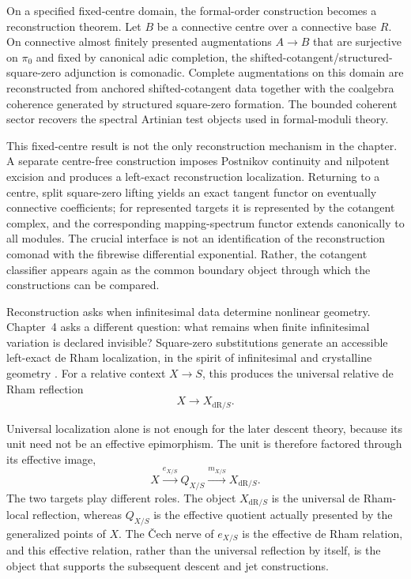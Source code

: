 On a specified fixed-centre domain, the formal-order construction becomes a
reconstruction theorem.  Let \(B\) be a connective centre over a connective
base \(R\).  On connective almost finitely presented augmentations
\(A\to B\) that are surjective on \(\pi_0\) and fixed by canonical adic
completion, the shifted-cotangent/structured-square-zero adjunction is
comonadic.  Complete augmentations on this domain are reconstructed from
anchored shifted-cotangent data together with the coalgebra coherence generated
by
structured square-zero formation.  The bounded coherent sector
recovers the spectral Artinian test objects used in formal-moduli theory.

This fixed-centre result is not the only reconstruction mechanism in the
chapter.  A separate centre-free construction imposes Postnikov continuity
and nilpotent excision and produces a left-exact reconstruction localization.
Returning to a centre, split square-zero lifting yields an exact tangent
functor on eventually connective coefficients; for represented targets it is
represented by the cotangent complex, and the corresponding mapping-spectrum
functor extends canonically to all modules.  The crucial interface is not an
identification of the reconstruction comonad with the fibrewise differential
exponential.  Rather, the cotangent
classifier appears again as the common boundary object through which the
constructions can be compared.

Reconstruction asks when infinitesimal data determine nonlinear geometry.
Chapter~4 asks a different question: what remains when finite infinitesimal
variation is declared invisible?  Square-zero substitutions generate an
accessible left-exact de Rham localization, in the spirit of infinitesimal
and crystalline geometry
\cite{Ogus1975InfinitesimalSite,GaitsgoryRozenblyum2014Crystals,BeilinsonDrinfeld2004}.
For a relative context \(X\to S\), this produces the universal relative
de Rham reflection
\[
    X\longrightarrow X_{\mathrm{dR}/S}.
\]

Universal localization alone is not enough for the later descent theory,
because its unit need not be an effective epimorphism.  The unit is therefore
factored through its effective image,
\[
    X
    \xrightarrow{e_{X/S}}
    Q_{X/S}
    \xrightarrow{m_{X/S}}
    X_{\mathrm{dR}/S}.
\]
The two targets play different roles.  The object
\(X_{\mathrm{dR}/S}\) is the universal de Rham-local reflection, whereas
\(Q_{X/S}\) is the effective quotient actually presented by the generalized
points of \(X\).  The \v{C}ech nerve of
\(e_{X/S}\) is the effective de Rham relation, and this effective relation,
rather than the universal reflection by itself, is the object that supports
the subsequent descent and jet constructions.

